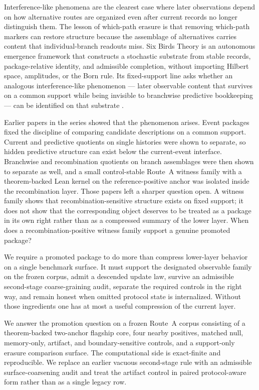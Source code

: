 \documentclass[11pt]{article}
\theoremstyle{definition}
\begin{document}
Interference-like phenomena are the clearest case where later observations depend on how alternative routes are organized even after current records no longer distinguish them. The lesson of which-path erasure is that removing which-path markers can restore structure because the assemblage of alternatives carries content that individual-branch readouts miss. Six Birds Theory is an autonomous emergence framework that constructs a stochastic substrate from stable records, package-relative identity, and admissible completion, without importing Hilbert space, amplitudes, or the Born rule. Its fixed-support line asks whether an analogous interference-like phenomenon --- later observable content that survives on a common support while being invisible to branchwise predictive bookkeeping --- can be identified on that substrate \citep{Tsiokos2026EventPackages,Tsiokos2026HolonomyMemory,Tsiokos2026MarkingErasureRecombination,Tsiokos2026RecombinationWitnesses}.

Earlier papers in the series showed that the phenomenon arises. Event packages fixed the discipline of comparing candidate descriptions on a common support. Current and predictive quotients on single histories were shown to separate, so hidden predictive structure can exist below the current-event interface. Branchwise and recombination quotients on branch assemblages were then shown to separate as well, and a small control-stable Route~A witness family with a theorem-backed Lean kernel on the reference-positive anchor was isolated inside the recombination layer. Those papers left a sharper question open. A witness family shows that recombination-sensitive structure exists on fixed support; it does not show that the corresponding object deserves to be treated as a package in its own right rather than as a compressed summary of the lower layer. When does a recombination-positive witness family support a genuine promoted package?

We require a promoted package to do more than compress lower-layer behavior on a single benchmark surface. It must support the designated observable family on the frozen corpus, admit a descended update law, survive an admissible second-stage coarse-graining audit, separate the required controls in the right way, and remain honest when omitted protocol state is internalized. Without those ingredients one has at most a useful compression of the current layer.

We answer the promotion question on a frozen Route~A corpus consisting of a theorem-backed two-anchor flagship core, four nearby positives, matched null, memory-only, artifact, and boundary-sensitive controls, and a support-only erasure comparison surface. The computational side is exact-finite and reproducible. We replace an earlier vacuous second-stage rule with an admissible surface-coarsening audit and treat the artifact control in paired protocol-aware form rather than as a single legacy row.
\end{document}
